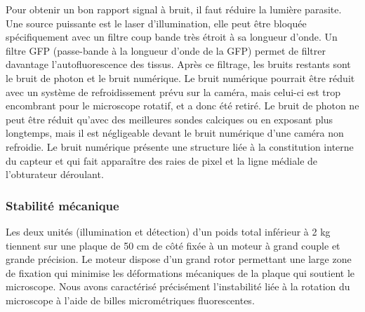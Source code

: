 
Pour obtenir un bon rapport signal à bruit, il faut réduire la lumière parasite. Une source puissante est le laser d'illumination, elle peut être bloquée spécifiquement avec un filtre coup bande très étroit à sa longueur d'onde. Un filtre GFP (passe-bande à la longueur d'onde de la GFP) permet de filtrer davantage l'autofluorescence des tissus. Après ce filtrage, les bruits restants sont le bruit de photon et le bruit numérique. Le bruit numérique pourrait être réduit avec un système de refroidissement prévu sur la caméra, mais celui-ci est trop encombrant pour le microscope rotatif, et a donc été retiré. Le bruit de photon ne peut être réduit qu'avec des meilleures sondes calciques ou en exposant plus longtemps, mais il est négligeable devant le bruit numérique d'une caméra non refroidie. Le bruit numérique présente une structure liée à la constitution interne du capteur et qui fait apparaître des raies de pixel et la ligne médiale de l'obturateur déroulant.



\subsubsection{Stabilité mécanique}

Les deux unités (illumination et détection) d'un poids total inférieur à 2 kg tiennent sur une plaque de 50 cm de côté fixée à un moteur à grand couple et grande précision. Le moteur dispose d'un grand rotor permettant une large zone de fixation qui minimise les déformations mécaniques de la plaque qui soutient le microscope. Nous avons caractérisé précisément l'instabilité liée à la rotation du microscope à l'aide de billes micrométriques fluorescentes.

